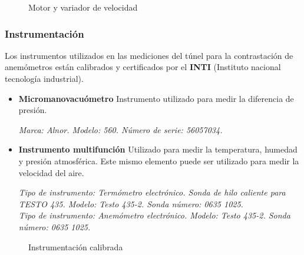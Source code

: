 \begin{figure}[htb]
	\centering
	\label{fig:motorr}
	\hfill
	\label{fig:LS650}
	\caption{Motor y variador de velocidad} 
	
\end{figure}



		
	\subsubsection{Instrumentación}
	Los instrumentos utilizados en las mediciones del túnel para la contrastación de anemómetros  están calibrados y certificados por el \textbf{INTI} (Instituto nacional tecnología industrial).
\begin{itemize}
	\item \textbf{Micromanovacuómetro }
		\subitem Instrumento utilizado para medir la diferencia de presión.
		
		\textit{Marca: Alnor. Modelo: 560. Número de serie: 56057034.} 
	\item \textbf{Instrumento multifunción}
	\subitem  Utilizado para medir la temperatura, humedad y presión atmosférica. Este mismo elemento puede ser utilizado para medir la velocidad del aire.
	
	\textit{Tipo de instrumento: Termómetro electrónico. Sonda de hilo caliente para TESTO 435.  Modelo: Testo 435-2. Sonda
	número: 0635 1025. \\ Tipo de instrumento: Anemómetro electrónico. Modelo: Testo 435-2. Sonda número: 0635 1025.}
	
	
\end{itemize}	   		
		
\begin{figure}[htbp]
	\centering
	\caption{Instrumentación calibrada} \label{fig:instr}
\end{figure}		
		
		
		\newpage